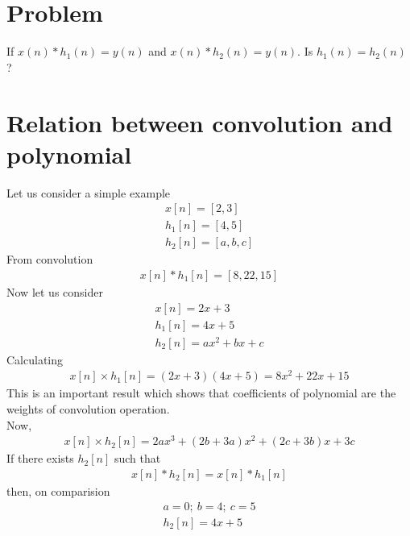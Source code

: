 \documentclass[journal,12pt,twocolumn]{IEEEtran}
\begin{document}
\section{Problem}
If $x(n)*h_1(n) = y(n)$ and  $x(n)*h_2(n) = y(n)$. 
Is $h_1(n)=h_2(n)$ ? 
\section{Relation between convolution and polynomial}
Let us consider a simple example 
\begin{align}
	x[n]=[2,3]\\ 
	h_1[n]=[4,5] \\
	h_2[n]=[a,b,c] 
\end{align}
From convolution 
\begin{align}
	x[n]*h_1[n]=[8,22,15] 
\end{align}
Now let us consider 
\begin{align}
	x[n] =2x+3 \\
	h_1[n]=4x+5 \\
	h_2[n]= ax^2+bx+c
\end{align}
Calculating
\begin{align}
	x[n]\times h_1[n] = (2x+3)(4x+5) = 8x^2 + 22x + 15
\end{align}
This is an important result  which shows that coefficients of polynomial are the weights of 
convolution operation. \\
Now,
\begin{align}
	x[n] \times h_2[n]=2ax^3+(2b+3a)x^2+(2c+3b)x+3c 
\end{align}
If there exists $h_2[n]$ such that 
\begin{align}
	x[n]*h_2[n] = x[n]*h_1[n]
\end{align}
then, on comparision 
\begin{align}
	a=0; \ b=4; \ c=5 \\
	h_2[n] = 4x+5
\end{align}
\end{document}

